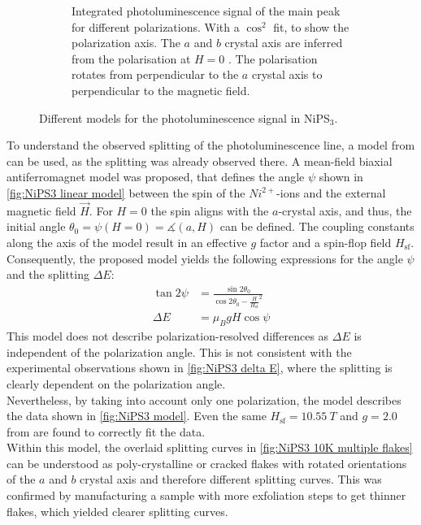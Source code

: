 \documentclass[
	twoside,
	parskip=half,
	a4paper,
]{scrbook}
\begin{document}
\begin{figure}
\begin{subfigure}[t]{3in}
		\caption{
			Integrated photoluminescence signal of the main peak for different polarizations. 
			With a $\cos^2$ fit, to show the polarization axis. 
			The $a$ and $b$ crystal axis are inferred from the polarisation at $H=0$ \cite{NiPS3_linear}.
			The polarisation rotates from perpendicular to the $a$ crystal axis to perpendicular to the magnetic field. 
		}
		\label{fig:NiPS3 polarisation peanut}
	\end{subfigure}
	\caption{Different models for the photoluminescence signal in NiPS$_3$.}
\end{figure}
To understand the observed splitting of the photoluminescence line, a model from \cite{NiPS3_magnon_gap} can be used, as the splitting was already observed there. 
A mean-field biaxial antiferromagnet model was proposed, that defines the angle $\psi$ shown in \autoref{fig:NiPS3 linear model} between the spin of the $Ni^{2+}$-ions and the external magnetic field $\vec{H}$.
For $H=0$ the spin aligns with the $a$-crystal axis, and thus, the initial angle $\theta_0=\psi\left(H=0\right)=\measuredangle(a, H)$ can be defined.
The coupling constants along the axis of the model result in an effective $g$ factor and a spin-flop field $H_\text{sf}$.
Consequently, the proposed model \autocite{NiPS3_magnon_gap} yields the following expressions for the angle $\psi$ and the splitting $\Delta E$:
\begin{align}
	\tan 2\psi &= \frac{\sin 2\theta_0}{\cos 2\theta_0 - \frac{H}{H_\text{sf}}^2}\\
	\Delta E &= \mu_B g H \cos \psi
	\label{eq:NiPS3 model}
\end{align}
This model does not describe polarization-resolved differences as $\Delta E$ is independent of the polarization angle.
This is not consistent with the experimental observations shown in \autoref{fig:NiPS3 delta E}, where the splitting is clearly dependent on the polarization angle.\\
Nevertheless, by taking into account only one polarization, the model describes the data shown in \autoref{fig:NiPS3 model}.
Even the same $H_\text{sf} = \SI{10.55}{T}$ and $g=\SI{2.0}{}$ from \autocite{NiPS3_magnon_gap} are found to correctly fit the data.\\
Within this model, the overlaid splitting curves in \autoref{fig:NiPS3 10K multiple flakes} can be understood as poly-crystalline or cracked flakes with rotated orientations of the $a$ and $b$ crystal axis and therefore different splitting curves.
This was confirmed by manufacturing a sample with more exfoliation steps to get thinner flakes, which yielded clearer splitting curves.
\end{document}
